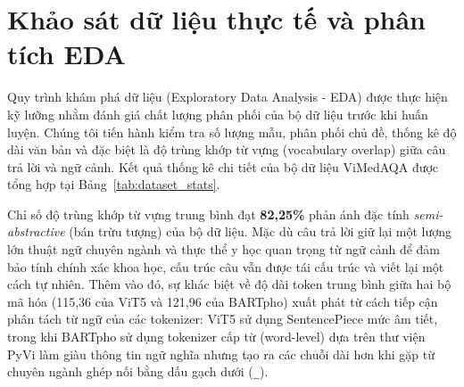 \section{Khảo sát dữ liệu thực tế và phân tích EDA}
Quy trình khám phá dữ liệu (Exploratory Data Analysis - EDA) được thực hiện kỹ lưỡng nhằm đánh giá chất lượng phân phối của bộ dữ liệu trước khi huấn luyện. Chúng tôi tiến hành kiểm tra số lượng mẫu, phân phối chủ đề, thống kê độ dài văn bản và đặc biệt là độ trùng khớp từ vựng (vocabulary overlap) giữa câu trả lời và ngữ cảnh. Kết quả thống kê chi tiết của bộ dữ liệu ViMedAQA được tổng hợp tại Bảng~\ref{tab:dataset_stats}.

\begin{table}[H]
\centering
\caption{Thống kê mô tả chi tiết bộ dữ liệu ViMedAQA thực tế}
\label{tab:dataset_stats}
\end{table}

Chỉ số độ trùng khớp từ vựng trung bình đạt \textbf{82,25\%} phản ánh đặc tính \textit{semi-abstractive} (bán trừu tượng) của bộ dữ liệu. Mặc dù câu trả lời giữ lại một lượng lớn thuật ngữ chuyên ngành và thực thể y học quan trọng từ ngữ cảnh để đảm bảo tính chính xác khoa học, cấu trúc câu vẫn được tái cấu trúc và viết lại một cách tự nhiên. Thêm vào đó, sự khác biệt về độ dài token trung bình giữa hai bộ mã hóa (115,36 của ViT5 và 121,96 của BARTpho) xuất phát từ cách tiếp cận phân tách từ ngữ của các tokenizer: ViT5 sử dụng SentencePiece mức âm tiết, trong khi BARTpho sử dụng tokenizer cấp từ (word-level) dựa trên thư viện PyVi làm giàu thông tin ngữ nghĩa nhưng tạo ra các chuỗi dài hơn khi gặp từ chuyên ngành ghép nối bằng dấu gạch dưới (\texttt{\_}).

